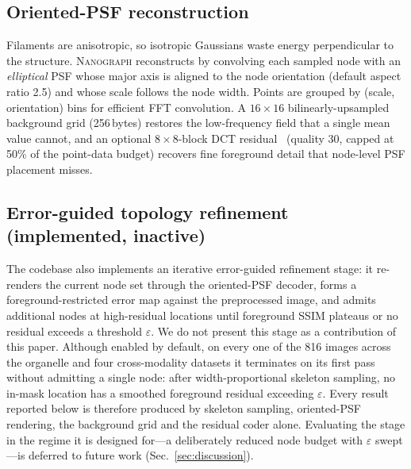 \documentclass[10pt,a4paper]{article}
\newcommand{\method}{\textnormal{\textsc{Nanograph}}\xspace}
\begin{document}
\subsection{Oriented-PSF reconstruction}
Filaments are anisotropic, so isotropic Gaussians waste energy perpendicular
to the structure. \method reconstructs by convolving each sampled node with an
\emph{elliptical} PSF whose major axis is aligned to the node orientation
(default aspect ratio 2.5) and whose scale follows the node width. Points are
grouped by (scale, orientation) bins for efficient FFT convolution. A
$16\times16$ bilinearly-upsampled background grid (256\,bytes) restores the
low-frequency field that a single mean value cannot, and an optional
$8\times8$-block DCT residual~\cite{ahmed1974dct} (quality 30, capped at 50\%
of the point-data budget) recovers fine foreground detail that node-level PSF
placement misses.

\subsection{Error-guided topology refinement (implemented, inactive)}
\label{sec:optimizer}
The codebase also implements an iterative error-guided refinement stage: it
re-renders the current node set through the oriented-PSF decoder, forms a
foreground-restricted error map against the preprocessed image, and admits
additional nodes at high-residual locations until foreground SSIM plateaus or
no residual exceeds a threshold $\varepsilon$. We do not present this stage
as a contribution of this paper. Although enabled by default, on every one of
the 816 images across the organelle and four cross-modality datasets it
terminates on its first pass without admitting a single node: after
width-proportional skeleton sampling, no in-mask location has a smoothed
foreground residual exceeding $\varepsilon$. Every result reported below is
therefore produced by skeleton sampling, oriented-PSF rendering, the
background grid and the residual coder alone. Evaluating the stage in the
regime it is designed for---a deliberately reduced node budget with
$\varepsilon$ swept---is deferred to future work
(Sec.~\ref{sec:discussion}).
\end{document}
